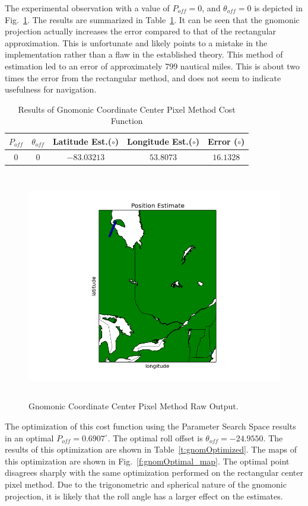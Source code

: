 \documentclass[12pt,a4paper]{book}
\begin{document}
The experimental observation with a value of $P_{off} = 0$, and $\theta_{off} = 0$ is depicted in Fig.~\ref{f:gnomRaw_map}.  The results are summarized in Table~\ref{t:gnomRaw}.  It can be seen that the gnomonic projection actually increases the error compared to that of the rectangular approximation.  This is unfortunate and likely points to a mistake in the implementation rather than a flaw in the established theory.  This method of estimation led to an error of approximately 799 nautical miles.  This is about two times the error from the rectangular method, and does not seem to indicate usefulness for navigation.  
\begin{table}[ht!]
\centering
\begin{tabular}{ |c|c|c|c|c| } 
 \hline
 $P_{off}$ & $\theta_{off}$ & Latitude Est.($\circ$) & Longitude Est.($\circ$)&Error ($\circ$) \\ 
 \hline
 $0$ & $0$ &$-83.03213$ & $53.8073$ &$16.1328$   \\ 
 \hline
\end{tabular}
\caption{Results of Gnomonic Coordinate Center Pixel Method Cost Function}
\label{t:gnomRaw}
\end{table}
\begin{figure}[!ht]
\centering
\includegraphics[height=10cm]{gnomRaw_map.png}
\caption{Gnomonic Coordinate Center Pixel Method Raw Output.}\label{f:gnomRaw_map}
\end{figure}
\FloatBarrier
The optimization of this cost function using the Parameter Search Space results in an optimal $P_{off} = 0.6907^{\circ}$.  The optimal roll offset is $\theta_{off} = -24.9550$.  The results of this optimization are shown in Table~\ref{t:gnomOptimized}.  The maps of this optimization are shown in Fig.~\ref{f:gnomOptimal_map}.  The optimal point disagrees sharply with the same optimization performed on the rectangular center pixel method.  Due to the trigonometric and spherical nature of the gnomonic projection, it is likely that the roll angle has a larger effect on the estimates.  
\end{document}
